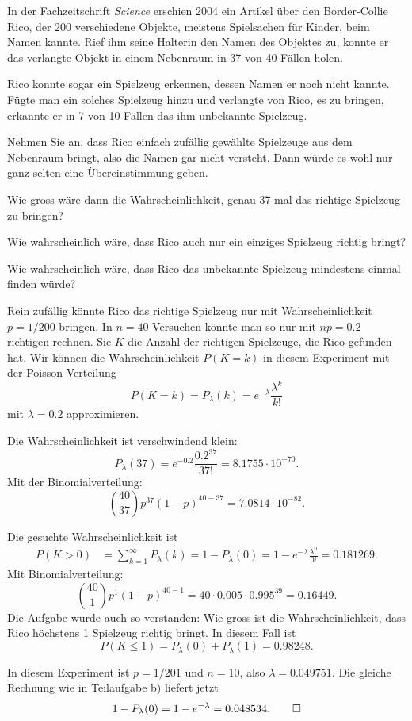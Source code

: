 In der Fachzeitschrift {\em Science} erschien 2004 ein Artikel über den
Border-Collie Rico, der 200 verschiedene Objekte, meistens Spielsachen
für Kinder, beim Namen kannte.
Rief ihm seine Halterin den Namen des Objektes zu, konnte er das verlangte
Objekt in einem Nebenraum in 37 von 40 Fällen holen.

Rico konnte sogar ein Spielzeug erkennen, dessen Namen er noch nicht
kannte.
Fügte man ein solches Spielzeug hinzu und verlangte von Rico, es zu bringen,
erkannte er in 7 von 10 Fällen das ihm unbekannte Spielzeug.

Nehmen Sie an, dass Rico einfach zufällig gewählte Spielzeuge aus
dem Nebenraum bringt, also die Namen gar nicht versteht.
Dann würde es wohl nur ganz selten eine Übereinstimmung geben.
\begin{teilaufgaben}
\item
Wie gross wäre dann die Wahrscheinlichkeit, genau 37 mal das richtige
Spielzeug zu bringen?
\item
Wie wahrscheinlich wäre, dass Rico auch nur ein einziges Spielzeug richtig
bringt?
\item
Wie wahrscheinlich wäre, dass Rico das unbekannte Spielzeug mindestens
einmal finden würde?
\end{teilaufgaben}


\begin{loesung}
Rein zufällig könnte Rico das richtige Spielzeug nur mit Wahrscheinlichkeit
$p=1/200$ bringen.
In $n=40$ Versuchen könnte man so nur mit $np=0.2$ richtigen rechnen.
Sie $K$ die Anzahl der richtigen Spielzeuge, die Rico gefunden hat.
Wir können die Wahrscheinlichkeit $P(K=k)$ in diesem Experiment mit der
Poisson-Verteilung
\[
P(K=k)
=
P_\lambda(k)
=
e^{-\lambda}\frac{\lambda^k}{k!}
\]
mit $\lambda=0.2$ approximieren.
\begin{teilaufgaben}
\item
Die Wahrscheinlichkeit ist verschwindend klein:
\[
P_\lambda(37)
=
e^{-0.2}\frac{0.2^{37}}{37!}=8.1755\cdot10^{-70}.
\]
Mit der Binomialverteilung:
\[
\binom{40}{37}p^{37}(1-p)^{40-37}=7.0814\cdot10^{-82}.
\]
\item
Die gesuchte Wahrscheinlichkeit ist
\begin{align*}
P(K>0)
&=
\sum_{k=1}^\infty P_\lambda(k)
=
1-P_\lambda(0)
=
1-e^{-\lambda}\frac{\lambda^0}{0!}
=
0.181269.
\end{align*}
Mit Binomialverteilung:
\[
\binom{40}{1}p^1(1-p)^{40-1}=40\cdot0.005\cdot 0.995^39 = 0.16449.
\]
Die Aufgabe wurde auch so verstanden: Wie gross ist die Wahrscheinlichkeit,
dass Rico höchstens 1 Spielzeug richtig bringt.
In diesem Fall ist 
\[
P(K\le 1)
=
P_\lambda(0)
+
P_\lambda(1)
=
0.98248.
\]
\item
In diesem Experiment ist $p=1/201$ und $n=10$, also $\lambda=0.049751$.
Die gleiche Rechnung wie in Teilaufgabe b) liefert jetzt
\[
1-P_\lambda(0)
=
1-e^{-\lambda}
=0.048534.
\qedhere
\]
\end{teilaufgaben}
\end{loesung}

